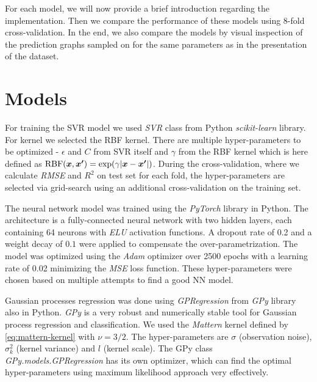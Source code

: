 For each model, we will now provide a brief introduction regarding the implementation. Then we compare the performance of these models using 8-fold cross-validation. In the end, we also compare the models by visual inspection of the prediction graphs sampled on for the same parameters as in the presentation of the dataset.

\section{Models}


For training the SVR model we used \textit{SVR} class from Python \textit{scikit-learn} library. For kernel we selected the RBF kernel. There are multiple hyper-parameters to be optimized - $\epsilon$ and $C$ from SVR itself and $\gamma$ from the RBF kernel which is here defined as $\mathrm{RBF}(\bm{x},\bm{x^\prime}) = \mathrm{exp}(\gamma \lvert \bm{x}-\bm{x^\prime} \rvert)$. During the cross-validation, where we calculate \textit{RMSE} and $R^2$ on test set for each fold, the hyper-parameters are selected via grid-search using an additional cross-validation on the training set.

The neural network model was trained using the \textit{PyTorch} library in Python. The architecture is a fully-connected neural network with two hidden layers, each containing 64 neurons with \textit{ELU} activation functions. A dropout rate of 0.2 and a weight decay of $0.1$ were applied to compensate the over-parametrization. The model was optimized using the \textit{Adam} optimizer over 2500 epochs with a learning rate of 0.02 minimizing the \textit{MSE} loss function. These hyper-parameters were chosen based on multiple attempts to find a good NN model.

Gaussian processes regression was done using \textit{GPRegression} from \textit{GPy} library also in Python. \textit{GPy} is a very robust and numerically stable tool for Gaussian process regression and classification. We used the \textit{Mattern} kernel defined by \ref{eq:mattern-kernel} with $\nu = 3/2$. The hyper-parameters are $\sigma$ (observation noise), $\sigma_k^2$ (kernel variance) and $l$ (kernel scale). The GPy class \textit{GPy.models.GPRegression} has its own optimizer, which can find the optimal hyper-parameters using maximum likelihood approach very effectively. 

